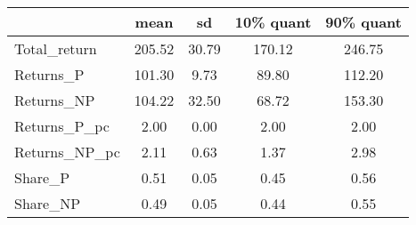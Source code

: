\begin{tabular}{lcccc}
\toprule
{} &    mean &     sd &  10\% quant &  90\% quant \\
\midrule
Total\_return  &  205.52 &  30.79 &     170.12 &     246.75 \\
Returns\_P     &  101.30 &   9.73 &      89.80 &     112.20 \\
Returns\_NP    &  104.22 &  32.50 &      68.72 &     153.30 \\
Returns\_P\_pc  &    2.00 &   0.00 &       2.00 &       2.00 \\
Returns\_NP\_pc &    2.11 &   0.63 &       1.37 &       2.98 \\
Share\_P       &    0.51 &   0.05 &       0.45 &       0.56 \\
Share\_NP      &    0.49 &   0.05 &       0.44 &       0.55 \\
\bottomrule
\end{tabular}
